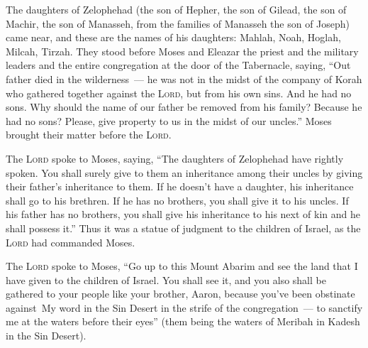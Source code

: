 
\begin{inparaenum}
     The daughters of Zelophehad (the son of Hepher, the son of Gilead, the son of Machir, the son of Manasseh, from the families of Manasseh the son of Joseph) came near, and these are the names of his daughters: Mahlah, Noah, Hoglah, Milcah, Tirzah.%
     They stood before Moses and Eleazar the priest and the military leaders and the entire congregation at the door of the Tabernacle, saying,%
     ``Out father died in the wilderness~--- he was not in the midst of the company of Korah who gathered together against the \textsc{Lord}, but from his own sins. And he had no sons.%
     Why should the name of our father be removed from his family? Because he had no sons? Please, give property to us in the midst of our uncles.''%
     Moses brought their matter before the \textsc{Lord}.%
    
     The \textsc{Lord} spoke to Moses, saying,%
     ``The daughters of Zelophehad have rightly spoken. You shall surely give to them an inheritance among their uncles by giving their father's inheritance to them.%
     If he doesn't have a daughter, his inheritance shall go to his brethren.%
     If he has no brothers, you shall give it to his uncles.%
     If his father has no brothers, you shall give his inheritance to his next of kin and he shall possess it.'' Thus it was a statue of judgment to the children of Israel, as the \textsc{Lord} had commanded Moses.%
    
     The \textsc{Lord} spoke to Moses, ``Go up to this Mount Abarim and see the land that I have given to the children of Israel.%
     You shall see it, and you also shall be gathered to your people like your brother, Aaron,%
     because you've been obstinate against\understood\ My word in the Sin Desert in the strife of the congregation~--- to sanctify me at the waters before their eyes'' (them being the waters of Meribah in Kadesh in the Sin Desert).%
    

\end{inparaenum}

